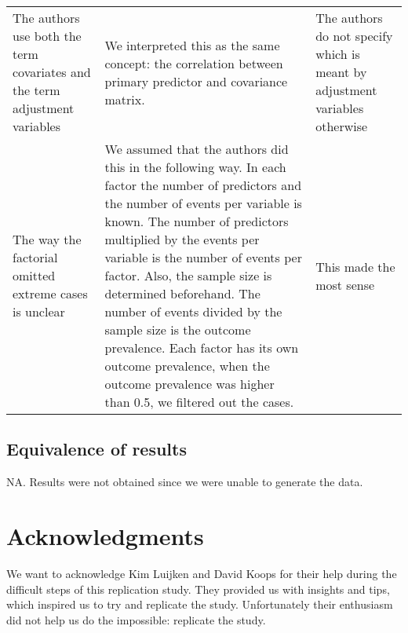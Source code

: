 \documentclass[10,a4paperpaper,]{article}
\begin{document}
\begin{longtable}[]{@{}lll@{}}
\begin{minipage}[t]{0.30\columnwidth}
The authors use both the term covariates and the term adjustment
variables\strut
\end{minipage} & \begin{minipage}[t]{0.30\columnwidth}\raggedright
We interpreted this as the same concept: the correlation between primary
predictor and covariance matrix.\strut
\end{minipage} & \begin{minipage}[t]{0.30\columnwidth}\raggedright
The authors do not specify which is meant by adjustment variables
otherwise\strut
\end{minipage}\tabularnewline
\begin{minipage}[t]{0.30\columnwidth}\raggedright
The way the factorial omitted extreme cases is unclear\strut
\end{minipage} & \begin{minipage}[t]{0.30\columnwidth}\raggedright
We assumed that the authors did this in the following way. In each
factor the number of predictors and the number of events per variable is
known. The number of predictors multiplied by the events per variable is
the number of events per factor. Also, the sample size is determined
beforehand. The number of events divided by the sample size is the
outcome prevalence. Each factor has its own outcome prevalence, when the
outcome prevalence was higher than 0.5, we filtered out the cases.\strut
\end{minipage} & \begin{minipage}[t]{0.30\columnwidth}\raggedright
This made the most sense\strut
\end{minipage}\tabularnewline
\bottomrule
\end{longtable}

\subsection{Equivalence of results}

NA. Results were not obtained since we were unable to generate the data.

\section{Acknowledgments}

We want to acknowledge Kim Luijken and David Koops for their help during
the difficult steps of this replication study. They provided us with
insights and tips, which inspired us to try and replicate the study.
Unfortunately their enthusiasm did not help us do the impossible:
replicate the study.
\end{document}
